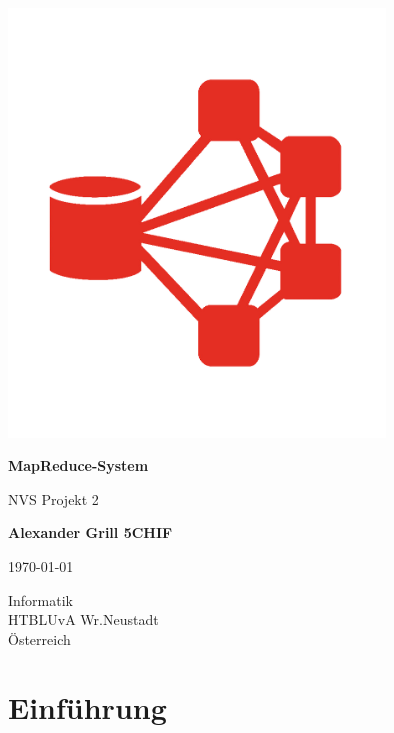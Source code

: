 \documentclass[a4paper,12pt]{article}
\begin{document}
\begin{titlepage}
    \begin{center}
        \vspace*{1cm}
        \includegraphics[width=10cm]{Logo.png}
        
        \textbf{\huge MapReduce-System}
        
        \vspace{0.5cm}
        NVS Projekt 2
                 
        \vspace{1.0cm}
    
        \textbf{Alexander Grill 5CHIF}
        
        \today
        
        \vfill
                 
                 
        \vspace{0.5cm}
                 
        Informatik\\
        HTBLUvA Wr.Neustadt\\
        Österreich\\

                 
    \end{center}
\end{titlepage}  
\newpage
\tableofcontents
\newpage


\section{Einführung}
\end{document}
